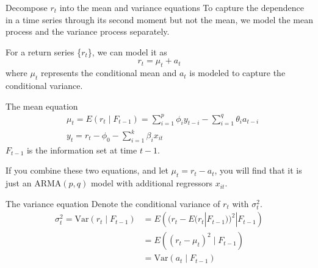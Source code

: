 \documentclass[presentation,10pt]{beamer}
\newcommand{\var}{\mathrm{Var}}
\begin{document}
\begin{frame}[label={sec:org5263004}]{Decompose \(r_t\) into the mean and variance equations}
To capture the dependence in a time series through its second moment
but not the mean, we model the mean process and the variance process
separately. 

For a return series \{\(r_t\)\}, we can model it as
\begin{equation}
\label{eq:mean-plus-var}
r_t = \mu_t + a_t
\end{equation}
where \(\mu_t\) represents the conditional mean and \(a_t\) is
modeled to capture the conditional variance.
\end{frame}

\begin{frame}[label={sec:orgcbb8b96}]{The mean equation}
\begin{align}
&\mu_t = E(r_t \mid F_{t-1}) = \sum_{i=1}^p \phi_i y_{t-i} - \sum_{i=1}^q \theta_i a_{t-i} \label{eq:mean-equation} \\
&y_t = r_t - \phi_0 - \sum_{i=1}^k \beta_i x_{it} \nonumber
\end{align}
\(F_{t-1}\) is the information set at time \(t-1\). 

\vspace{0.5cm}

If you combine these two equations, and let \(\mu_t = r_t - a_t\), you
will find that it is just an ARMA\((p, q)\) model with additional
regressors \(x_{it}\).
\end{frame}

\begin{frame}[label={sec:orgad61cb1}]{The variance equation}
Denote the conditional variance of \(r_t\) with \(\sigma^2_t\).
\begin{equation*}
\begin{split}
\sigma^2_t = \var(r_t \mid F_{t-1}) &= E\left( (r_t - E(r_t | F_{t-1}))^2 | F_{t-1} \right) \\
&= E\left( (r_t - \mu_t)^2 \mid F_{t-1} \right) \\
&= \var(a_t \mid F_{t-1})
\end{split}
\end{equation*}
\end{frame}
\end{document}
